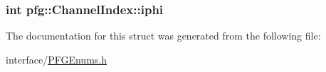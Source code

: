 \subsubsection[{iphi}]{\setlength{\rightskip}{0pt plus 5cm}int pfg\+::\+Channel\+Index\+::iphi}\label{structpfg_1_1_channel_index_af07100d9ef0b2b17cfff4b70f5297986}


The documentation for this struct was generated from the following file\+:\begin{DoxyCompactItemize}
\item 
interface/\hyperlink{_p_f_g_enums_8h}{P\+F\+G\+Enums.\+h}\end{DoxyCompactItemize}
